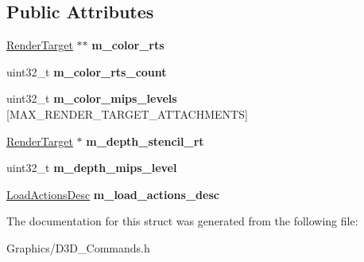 \subsection*{Public Attributes}
\begin{DoxyCompactItemize}
\item 
\mbox{\label{structDXCMD__Bind__RenderTargets_aa773970722660d12f8b94502668c7aa7}} 
\hyperlink{classRenderTarget}{Render\+Target} $\ast$$\ast$ {\bfseries m\+\_\+color\+\_\+rts}
\item 
\mbox{\label{structDXCMD__Bind__RenderTargets_a711337333007c11230ae1eef0cc342bc}} 
uint32\+\_\+t {\bfseries m\+\_\+color\+\_\+rts\+\_\+count}
\item 
\mbox{\label{structDXCMD__Bind__RenderTargets_ae6a284b3ae724ca4fc9c2f9d8ef9d023}} 
uint32\+\_\+t {\bfseries m\+\_\+color\+\_\+mips\+\_\+levels} \mbox{[}M\+A\+X\+\_\+\+R\+E\+N\+D\+E\+R\+\_\+\+T\+A\+R\+G\+E\+T\+\_\+\+A\+T\+T\+A\+C\+H\+M\+E\+N\+TS\mbox{]}
\item 
\mbox{\label{structDXCMD__Bind__RenderTargets_ad8981eafe95b51f8deaab69767c10a56}} 
\hyperlink{classRenderTarget}{Render\+Target} $\ast$ {\bfseries m\+\_\+depth\+\_\+stencil\+\_\+rt}
\item 
\mbox{\label{structDXCMD__Bind__RenderTargets_acf825a0ddb04984a426dbe7c84384b80}} 
uint32\+\_\+t {\bfseries m\+\_\+depth\+\_\+mips\+\_\+level}
\item 
\mbox{\label{structDXCMD__Bind__RenderTargets_a5f44227ce7d88552ce1038adec5bc00f}} 
\hyperlink{structLoadActionsDesc}{Load\+Actions\+Desc} {\bfseries m\+\_\+load\+\_\+actions\+\_\+desc}
\end{DoxyCompactItemize}


The documentation for this struct was generated from the following file\+:\begin{DoxyCompactItemize}
\item 
Graphics/D3\+D\+\_\+\+Commands.\+h\end{DoxyCompactItemize}
